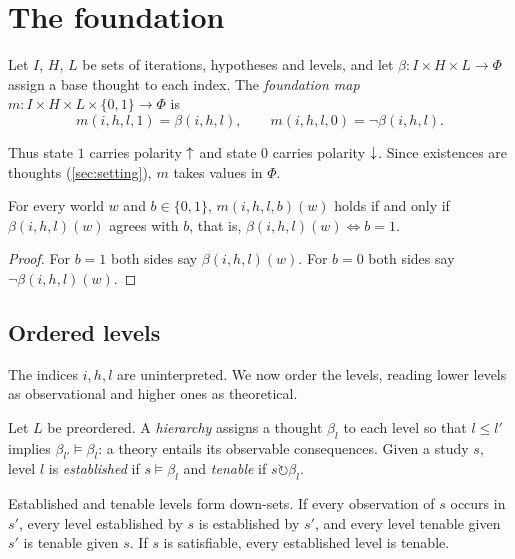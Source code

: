 \section{The foundation}\label{sec:foundation}

\begin{definition}
Let $I$, $H$, $L$ be sets of iterations, hypotheses and levels, and let
$\beta:I\times H\times L\to\Phi$ assign a base thought to each index. The \emph{foundation map}
$m:I\times H\times L\times\{0,1\}\to\Phi$ is
\[
  m(i,h,l,1)=\beta(i,h,l),\qquad m(i,h,l,0)=\neg\beta(i,h,l).
\]
\end{definition}

Thus state $1$ carries polarity ${\uparrow}$ and state $0$ carries polarity ${\downarrow}$. Since existences
are thoughts (\cref{sec:setting}), $m$ takes values in $\Phi$.

\begin{proposition}\label{prop:m}
For every world $w$ and $b\in\{0,1\}$, $m(i,h,l,b)(w)$ holds if and only if $\beta(i,h,l)(w)$
agrees with $b$, that is, $\beta(i,h,l)(w)\iff b=1$.
\end{proposition}

\begin{proof}
For $b=1$ both sides say $\beta(i,h,l)(w)$. For $b=0$ both sides say $\neg\beta(i,h,l)(w)$.
\end{proof}

\subsection{Ordered levels}\label{sec:levels}

The indices $i,h,l$ are uninterpreted. We now order the levels, reading lower levels as
observational and higher ones as theoretical.

\begin{definition}[Hierarchy]\label{def:hierarchy}
Let $L$ be preordered. A \emph{hierarchy} assigns a thought $\beta_l$ to each level so that
$l\le l'$ implies $\beta_{l'}\models\beta_l$: a theory entails its observable consequences. Given
a study $s$, level $l$ is \emph{established} if $s\models\beta_l$ and \emph{tenable} if
$s\circlearrowright\beta_l$.
\end{definition}

\begin{theorem}\label{thm:upward}
Established and tenable levels form down-sets. If every observation of $s$ occurs in $s'$, every
level established by $s$ is established by $s'$, and every level tenable given $s'$ is tenable
given $s$. If $s$ is satisfiable, every established level is tenable.
\end{theorem}

